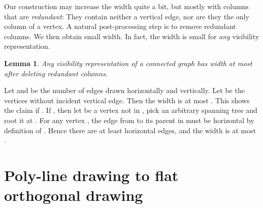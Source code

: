\documentclass{elsarticle}
\newtheorem{lemma}{Lemma}
\newenvironment{proof}{{\bf Proof: }}{\hspace*{\fill}\medskip}
\begin{document}
Our construction may increase the width quite a bit, but mostly with
columns that are {\em redundant}: They contain neither a vertical
edge, nor are they the only column of a vertex.  A natural post-processing
step is to remove redundant columns.  We then obtain small width.
In fact, the width is small for {\em any} visibility representation.

\begin{lemma}
Any visibility representation of a connected graph has width at most  after deleting redundant columns.
\end{lemma}
\begin{proof}
Let  and  be the number of edges drawn horizontally and vertically.
Let  be the vertices without incident vertical edge.
Then the width is at most .   This shows the claim if .
If , then let  be a vertex not in , 
pick an arbitrary spanning tree  and root it at .
For any vertex , the edge from  to its parent in 
must be horizontal by definition of .  Hence there are
at least  horizontal edges,
and the width is at most .
\end{proof}

\section{Poly-line drawing to flat orthogonal drawing}
\label{se:SL_VR}
\end{document}
